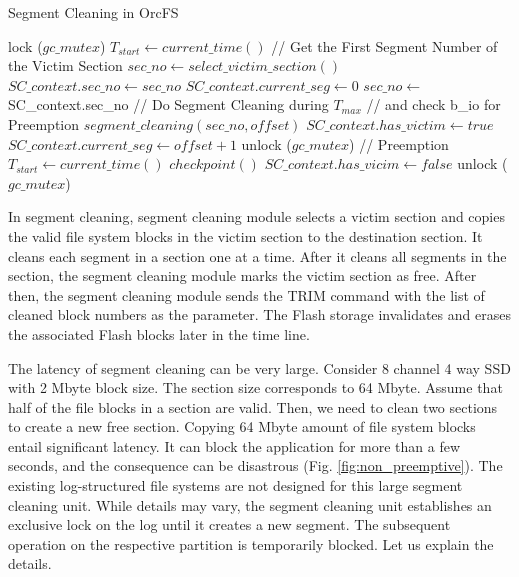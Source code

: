 \documentclass[prodmode,acmtecs]{acmsmall}
\begin{document}
 \begin{algorithm}[t]
 \caption{Segment Cleaning in OrcFS}
 \label{pseudo:qpsc}
 \begin{algorithmic}[1]
 \small
 \State lock ($gc\_mutex$)
 \State $T_{start} \gets current\_time()$
 \State // Get the First Segment Number of the Victim Section
 \State $sec\_no \gets select\_victim\_section()$
 \State $SC\_context.sec\_no \gets sec\_no$
 \State $SC\_context.current\_seg \gets $0
 \Else
 \State $sec\_no \gets $SC\_context.sec\_no
 \EndIf
 \State // Do Segment Cleaning during $T_{max}$
 \State // and check b\_io for Preemption
 \State $segment\_cleaning(sec\_no, offset)$ 
 \State $SC\_context.has\_victim \gets true$
 \State $SC\_context.current\_seg \gets offset+1$
 \State unlock ($gc\_mutex$)
 \State \Return // Preemption
 \Else
 \State $T_{start} \gets current\_time()$
 \EndIf
 \EndIf
 \EndFor
 \State $checkpoint()$
 \EndIf
 \State $SC\_context.has\_vicim \gets false$
 \State unlock ($gc\_mutex$)
 \State \Return
 \EndFunction
 \end{algorithmic}
\end{algorithm}

In segment cleaning, segment cleaning module selects a victim section
and copies the valid file system blocks in the victim section to the
destination section.  It cleans each segment in a section one at a
time. After it cleans all segments in the section, the segment
cleaning module marks the victim section as free.  After then, the
segment cleaning module sends the TRIM command \cite{shu2007data} with
the list of cleaned block numbers as the parameter. The Flash storage
invalidates and erases the associated Flash blocks later in the time
line.

The latency of segment cleaning can be very large. Consider 8 channel
4 way SSD with 2 Mbyte block size. The section size corresponds to 64
Mbyte. Assume that half of the file blocks in a section are
valid. Then, we need to clean two sections to create a new free
section. Copying 64 Mbyte amount of file system blocks entail
significant latency. It can block the application for more than a few
seconds, and the consequence can be disastrous
(Fig. \ref{fig:non_preemptive}).  The existing log-structured
file systems are not designed for this large segment cleaning
unit. While details may vary, the segment cleaning unit establishes an
exclusive lock on the log until it creates a new segment. The
subsequent operation on the respective partition is temporarily
blocked. Let us explain the details.
\end{document}
